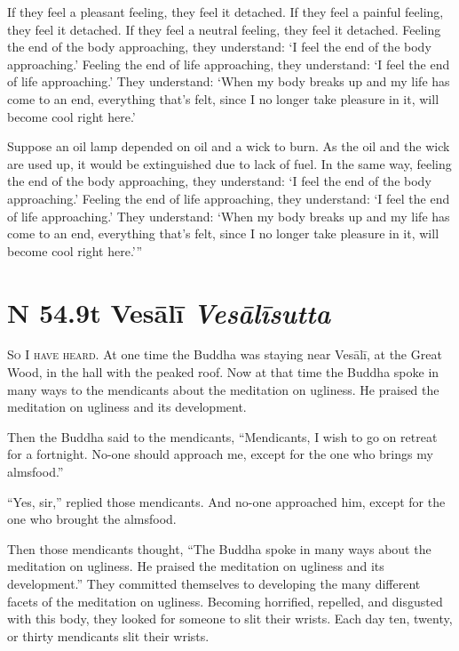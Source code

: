 \documentclass[12pt,openany]{book}%
\newcommand*{\suttatitleacronym}[1]{\smaller[2]{#1}\vspace*{.3em}}
\newcommand*{\suttatitletranslation}[1]{\linebreak{#1}}
\newcommand*{\suttatitleroot}[1]{\linebreak\smaller[2]\itshape{#1}}
\newcommand*{\tocacronym}[1]{\hspace*{-3.3em}{#1}\quad}
\newcommand*{\toctranslation}[1]{#1}
\newcommand*{\tocroot}[1]{(\textit{#1})}
\newcommand*{\scevam}[1]{\textsc{#1}}
\begin{document}
If they feel a pleasant feeling, they feel it detached. If they feel a painful feeling, they feel it detached. If they feel a neutral feeling, they feel it detached. Feeling the end of the body approaching, they understand: ‘I feel the end of the body approaching.’ Feeling the end of life approaching, they understand: ‘I feel the end of life approaching.’ They understand: ‘When my body breaks up and my life has come to an end, everything that’s felt, since I no longer take pleasure in it, will become cool right here.’ 

Suppose an oil lamp depended on oil and a wick to burn. As the oil and the wick are used up, it would be extinguished due to lack of fuel. In the same way, feeling the end of the body approaching, they understand: ‘I feel the end of the body approaching.’ Feeling the end of life approaching, they understand: ‘I feel the end of life approaching.’ They understand: ‘When my body breaks up and my life has come to an end, everything that’s felt, since I no longer take pleasure in it, will become cool right here.’” 

%
\section*{{\suttatitleacronym SN 54.9}{\suttatitletranslation At Vesālī }{\suttatitleroot Vesālīsutta}}
\addcontentsline{toc}{section}{\tocacronym{SN 54.9} \toctranslation{At Vesālī } \tocroot{Vesālīsutta}}

\scevam{So I have heard. }At one time the Buddha was staying near \textsanskrit{Vesālī}, at the Great Wood, in the hall with the peaked roof. Now at that time the Buddha spoke in many ways to the mendicants about the meditation on ugliness. He praised the meditation on ugliness and its development. 

Then the Buddha said to the mendicants, “Mendicants, I wish to go on retreat for a fortnight. No-one should approach me, except for the one who brings my almsfood.” 

“Yes, sir,” replied those mendicants. And no-one approached him, except for the one who brought the almsfood. 

Then those mendicants thought, “The Buddha spoke in many ways about the meditation on ugliness. He praised the meditation on ugliness and its development.” They committed themselves to developing the many different facets of the meditation on ugliness. Becoming horrified, repelled, and disgusted with this body, they looked for someone to slit their wrists. Each day ten, twenty, or thirty mendicants slit their wrists. 
\end{document}
